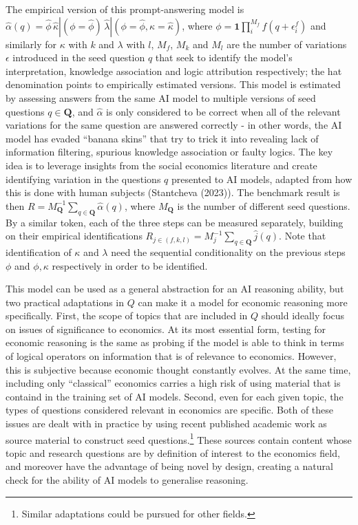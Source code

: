 \documentclass[
]{article}
\begin{document}
The empirical version of this prompt-answering model is
\(\hat{\alpha}(q) = \hat{\phi} \, \hat{\kappa}|(\phi=\hat{\phi}) \, \hat{\lambda}|(\phi=\hat{\phi}, \kappa=\hat{\kappa})\),
where \(\phi = \mathbf{1} \prod_{i}^{M_f} f(q + \epsilon_i^f)\) and
similarly for \(\kappa\) with \(k\) and \(\lambda\) with \(l\), \(M_f\),
\(M_k\) and \(M_l\) are the number of variations \(\epsilon\) introduced
in the seed question \(q\) that seek to identify the model's
interpretation, knowledge association and logic attribution
respectively; the hat denomination points to empirically estimated
versions. This model is estimated by assessing answers from the same AI
model to multiple versions of seed questions \(q \in \mathbf{Q}\), and
\(\hat{\alpha}\) is only considered to be correct when all of the
relevant variations for the same question are answered correctly - in
other words, the AI model has evaded ``banana skins'' that try to trick
it into revealing lack of information filtering, spurious knowledge
association or faulty logics. The key idea is to leverage insights from
the social economics literature and create identifying variation in the
questions \(q\) presented to AI models, adapted from how this is done
with human subjects (Stantcheva (2023)). The benchmark result is then
\(R = M_{\mathbf{Q}}^{-1}\sum_{q \in \mathbf{Q}} \hat{\alpha}(q)\),
where \(M_{\mathbf{Q}}\) is the number of different seed questions. By a
similar token, each of the three steps can be measured separately,
building on their empirical identifications
\(R_{j \in (f, k, l)} = M_{j}^{-1}\sum_{q \in \mathbf{Q}} \hat{j}(q)\).
Note that identification of \(\kappa\) and \(\lambda\) need the
sequential conditionality on the previous steps \(\phi\) and
\(\phi, \kappa\) respectively in order to be identified.

This model can be used as a general abstraction for an AI reasoning
ability, but two practical adaptations in \(Q\) can make it a model for
economic reasoning more specifically. First, the scope of topics that
are included in \(Q\) should ideally focus on issues of significance to
economics. At its most essential form, testing for economic reasoning is
the same as probing if the model is able to think in terms of logical
operators on information that is of relevance to economics. However,
this is subjective because economic thought constantly evolves. At the
same time, including only ``classical'' economics carries a high risk of
using material that is containd in the training set of AI models.
Second, even for each given topic, the types of questions considered
relevant in economics are specific. Both of these issues are dealt with
in practice by using recent published academic work as source material
to construct seed questions.\footnote{Similar adaptations could be
  pursued for other fields.} These sources contain content whose topic
and research questions are by definition of interest to the economics
field, and moreover have the advantage of being novel by design,
creating a natural check for the ability of AI models to generalise
reasoning.
\end{document}
